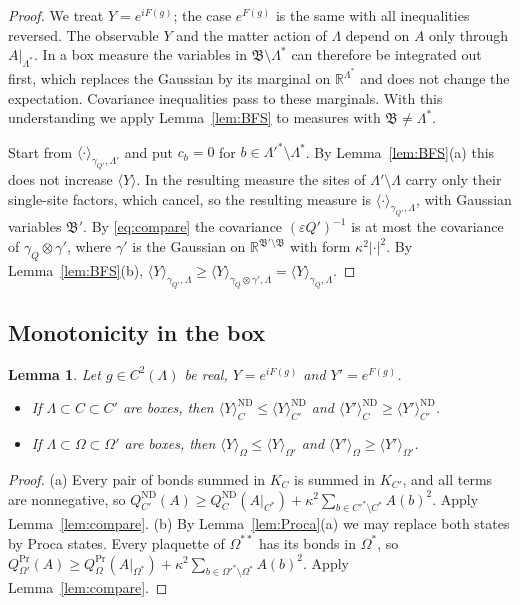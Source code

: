 \documentclass[11pt]{amsart}
\theoremstyle{plain}
\newtheorem{lemma}[theorem]{Lemma}
\theoremstyle{definition}
\theoremstyle{remark}
\numberwithin{equation}{section}
\newcommand{\R}{\mathbb{R}}
\newcommand{\eps}{\varepsilon}
\newcommand{\fB}{\mathfrak{B}}
\newcommand{\abs}[1]{\lvert #1\rvert}
\newcommand{\ev}[1]{\langle #1\rangle}
\begin{document}
\begin{proof}
We treat $Y=e^{iF(g)}$; the case $e^{F(g)}$ is the same with all inequalities reversed. The observable $Y$ and the matter action of $\Lambda$ depend on $A$ only through $A|_{\Lambda^*}$. In a box measure the variables in $\fB\setminus\Lambda^*$ can therefore be integrated out first, which replaces the Gaussian by its marginal on $\R^{\Lambda^*}$ and does not change the expectation. Covariance inequalities pass to these marginals. With this understanding we apply Lemma~\ref{lem:BFS} to measures with $\fB\ne\Lambda^*$.

Start from $\ev\cdot_{\gamma_{Q'},\Lambda'}$ and put $c_b=0$ for $b\in\Lambda'^*\setminus\Lambda^*$. By Lemma~\ref{lem:BFS}(a) this does not increase $\ev Y$. In the resulting measure the sites of $\Lambda'\setminus\Lambda$ carry only their single-site factors, which cancel, so the resulting measure is $\ev\cdot_{\gamma_{Q'},\Lambda}$, with Gaussian variables $\fB'$. By \eqref{eq:compare} the covariance $(\eps Q')^{-1}$ is at most the covariance of $\gamma_Q\otimes\gamma'$, where $\gamma'$ is the Gaussian on $\R^{\fB'\setminus\fB}$ with form $\kappa^2\abs\cdot^2$. By Lemma~\ref{lem:BFS}(b), $\ev Y_{\gamma_{Q'},\Lambda}\ge\ev Y_{\gamma_Q\otimes\gamma',\Lambda}=\ev Y_{\gamma_Q,\Lambda}$.
\end{proof}

\subsection{Monotonicity in the box}

\begin{lemma}\label{lem:monotone}
Let $g\in C^2(\Lambda)$ be real, $Y=e^{iF(g)}$ and $Y'=e^{F(g)}$.
\begin{itemize}
\item[(a)] If $\Lambda\subset C\subset C'$ are boxes, then $\ev Y^{\mathrm{ND}}_C\le\ev Y^{\mathrm{ND}}_{C'}$ and $\ev{Y'}^{\mathrm{ND}}_C\ge\ev{Y'}^{\mathrm{ND}}_{C'}$.
\item[(b)] If $\Lambda\subset\Omega\subset\Omega'$ are boxes, then $\ev Y_\Omega\le\ev Y_{\Omega'}$ and $\ev{Y'}_\Omega\ge\ev{Y'}_{\Omega'}$.
\end{itemize}
\end{lemma}

\begin{proof}
(a) Every pair of bonds summed in $K_C$ is summed in $K_{C'}$, and all terms are nonnegative, so $Q^{\mathrm{ND}}_{C'}(A)\ge Q^{\mathrm{ND}}_C(A|_{C^*})+\kappa^2\sum_{b\in C'^*\setminus C^*}A(b)^2$. Apply Lemma~\ref{lem:compare}.
(b) By Lemma~\ref{lem:Proca}(a) we may replace both states by Proca states. Every plaquette of $\Omega^{**}$ has its bonds in $\Omega^*$, so $Q^{\mathrm{Pr}}_{\Omega'}(A)\ge Q^{\mathrm{Pr}}_\Omega(A|_{\Omega^*})+\kappa^2\sum_{b\in\Omega'^*\setminus\Omega^*}A(b)^2$. Apply Lemma~\ref{lem:compare}.
\end{proof}
\end{document}
